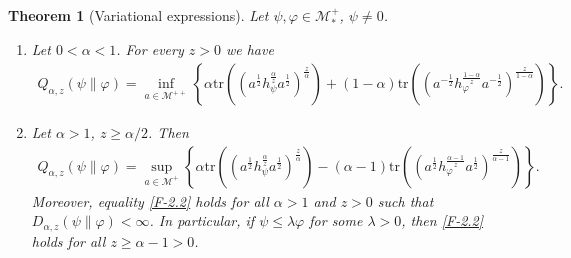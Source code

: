 \documentclass[12pt]{article}
\newtheorem{theorem}{Theorem}[section]
\theoremstyle{definition}
\theoremstyle{remark}
\numberwithin{equation}{section}
\def\Me{\mathcal M}
\def\Tr{\mathrm{tr}}
\def\ffi{\varphi}
\begin{document}
\begin{theorem}[Variational expressions]\label{thm:variational} Let $\psi,\varphi\in \Me_*^+$, $\psi\ne 0$. 
\begin{enumerate}
\item[(i)] Let $0<\alpha<1$. For every $z>0$ we have
\begin{align}\label{F-2.1}
Q_{\alpha,z}(\psi\|\varphi)=\inf_{a\in \Me^{++}}\left\{\alpha
\Tr\left((a^{\frac12}h_\psi^{\frac{\alpha}{z}}a^{\frac12})^{\frac{z}{\alpha}}\right)+(1-\alpha)
\Tr\left((a^{-\frac12}h_\varphi^{\frac{1-\alpha}{z}}a^{-\frac12})^{\frac{z}{1-\alpha}}\right) \right\}.
\end{align}

\item[(ii)] Let $\alpha>1$, $z\ge\alpha/2$. Then
\begin{align}\label{F-2.2}
Q_{\alpha,z}(\psi\|\varphi)=\sup_{a\in \Me^+} \left\{\alpha
\Tr\left((a^{\frac12}h_\psi^{\frac{\alpha}{z}}a^{\frac12})^{\frac{z}{\alpha}}\right)-(\alpha-1)
\Tr\left((a^{\frac12}h_\varphi^{\frac{\alpha-1}{z}}a^{\frac12})^{\frac{z}{\alpha-1}}\right) \right\}.
\end{align}
 Moreover,  equality \eqref{F-2.2} holds for all $\alpha>1$ and $z>0$ such that
$D_{\alpha,z}(\psi\|\ffi)<\infty$. In particular, if $\psi\le\lambda\ffi$ for some $\lambda>0$, then \eqref{F-2.2} holds for all
$z\ge\alpha-1>0$.
\end{enumerate}
\end{theorem}
\end{document}

